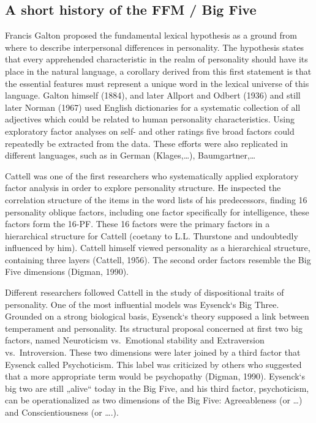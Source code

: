 \documentclass[man]{apa6}
\theoremstyle{definition}
\theoremstyle{definition}
\theoremstyle{definition}
\theoremstyle{remark}
\begin{document}
\hypertarget{a-short-history-of-the-ffm-big-five}{%
\subsection{A short history of the FFM / Big
Five}\label{a-short-history-of-the-ffm-big-five}}

Francis Galton proposed the fundamental lexical hypothesis as a ground
from where to describe interpersonal differences in personality. The
hypothesis states that every apprehended characteristic in the realm of
personality should have its place in the natural language, a corollary
derived from this first statement is that the essential features must
represent a unique word in the lexical universe of this language. Galton
himself (1884), and later Allport and Odbert (1936) and still later
Norman (1967) used English dictionaries for a systematic collection of
all adjectives which could be related to human personality
characteristics. Using exploratory factor analyses on self- and other
ratings five broad factors could repeatedly be extracted from the data.
These efforts were also replicated in different languages, such as in
German (Klages,\ldots{}), Baumgartner,\ldots{}

Cattell was one of the first researchers who systematically applied
exploratory factor analysis in order to explore personality structure.
He inspected the correlation structure of the items in the word lists of
his predecessors, finding 16 personality oblique factors, including one
factor specifically for intelligence, these factors form the 16-PF.
These 16 factors were the primary factors in a hierarchical structure
for Cattell (coetany to L.L. Thurstone and undoubtedly influenced by
him). Cattell himself viewed personality as a hierarchical structure,
containing three layers (Cattell, 1956). The second order factors
resemble the Big Five dimensions (Digman, 1990).

Different researchers followed Cattell in the study of dispositional
traits of personality. One of the most influential models was Eysenck`s
Big Three. Grounded on a strong biological basis, Eysenck`s theory
supposed a link between temperament and personality. Its structural
proposal concerned at first two big factors, named Neuroticism
vs.~Emotional stability and Extraversion vs.~Introversion. These two
dimensions were later joined by a third factor that Eysenck called
Psychoticism. This label was criticized by others who suggested that a
more appropriate term would be psychopathy (Digman, 1990). Eysenck`s big
two are still „alive`` today in the Big Five, and his third factor,
psychoticism, can be operationalized as two dimensions of the Big Five:
Agreeableness (or \ldots{}) and Conscientiousness (or \ldots{}.).
\end{document}
